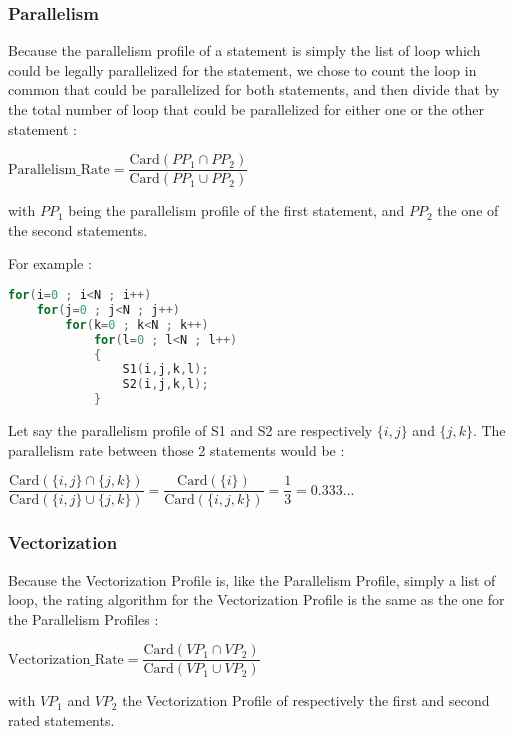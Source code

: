 \documentclass[paper=a4, fontsize=11.5pt]{scrartcl}
\numberwithin{equation}{section}        %
\numberwithin{figure}{section}          %
\numberwithin{table}{section}               %
\begin{document}
        \subsubsection{Parallelism}
            Because the parallelism profile of a statement is simply the list of loop
            which could be legally parallelized for the statement, we chose to count the
            loop in common that could be parallelized for both statements, and then
            divide that by the total number of loop that could be parallelized for either one
            or the other statement :
            \begin{center}
                $ \mathrm{Parallelism\_Rate} =  \dfrac{\mathrm{Card}( {PP_1} \cap {PP_2})}{\mathrm{Card}({PP_1} \cup {PP_2})}$
            \end{center}
            with $PP_1$ being the parallelism profile of the first statement, and $PP_2$ the
            one of the second statements.

            \bigskip

            For example :
\begin{lstlisting}[frame=single, language=C, caption={Parallelism profile rating example}, label={lst:pp_example}]
for(i=0 ; i<N ; i++)
    for(j=0 ; j<N ; j++)
        for(k=0 ; k<N ; k++)
            for(l=0 ; l<N ; l++)
            {
                S1(i,j,k,l);
                S2(i,j,k,l);
            }
\end{lstlisting}
        Let say the parallelism profile of S1 and S2 are respectively $\{i,j\}$ and $\{j,k\}$.
        The parallelism rate between those 2 statements would be :
        \begin{center}
            $\dfrac{\mathrm{Card}( \{i,j\} \cap \{j,k\})}{\mathrm{Card}( \{i,j\} \cup \{j,k\})}
            = \dfrac{\mathrm{Card}( \{i\})}{\mathrm{Card}( \{i,j,k\})}
            = \dfrac{1}{3}
            = 0.333...$
        \end{center}

        \subsubsection{Vectorization}
            Because the Vectorization Profile is, like the Parallelism Profile, simply a list of loop, the rating algorithm for the Vectorization Profile is the same as the one for the Parallelism Profiles :
            \begin{center}
                $ \mathrm{Vectorization\_Rate} =  \dfrac{\mathrm{Card}( {VP_1} \cap {VP_2})}{\mathrm{Card}({VP_1} \cup {VP_2})}$
            \end{center}
            with $VP_1$ and $VP_2$ the Vectorization Profile of respectively the first and second rated statements.
\end{document}
